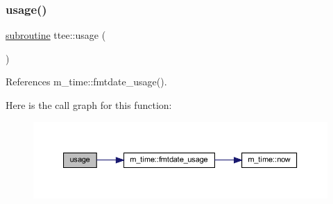 \subsubsection{\texorpdfstring{usage()}{usage()}}
{\footnotesize\ttfamily \hyperlink{M__stopwatch_83_8txt_acfbcff50169d691ff02d4a123ed70482}{subroutine} ttee\+::usage (\begin{DoxyParamCaption}{ }\end{DoxyParamCaption})}



References m\+\_\+time\+::fmtdate\+\_\+usage().

Here is the call graph for this function\+:
\nopagebreak
\begin{figure}[H]
\begin{center}
\leavevmode
\includegraphics[width=350pt]{ttee_8f90_a39e87a9f7d8f8fd9a22b457c12d7619a_cgraph}
\end{center}
\end{figure}
